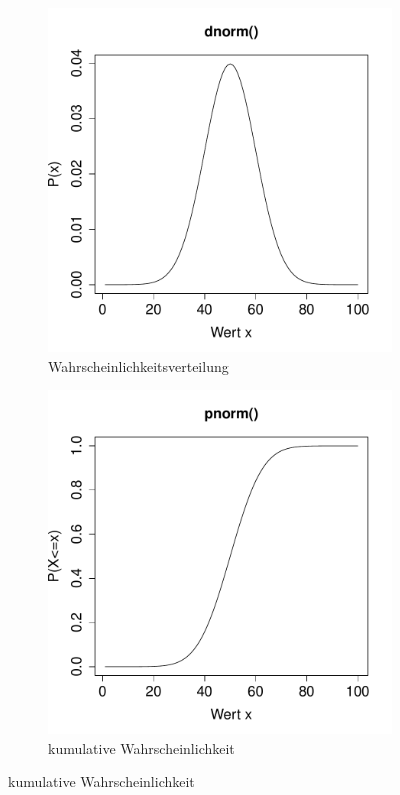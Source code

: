 \begin{figure}[h!]
\centering
\begin{subfigure}[b]{0.48\textwidth}
\includegraphics{verteilungen-060}
\caption{Wahrscheinlichkeitsverteilung}
\end{subfigure}
\begin{subfigure}[b]{0.48\textwidth}
\includegraphics{verteilungen-061}
\caption{kumulative Wahrscheinlichkeit}
\end{subfigure}


\end{figure}
